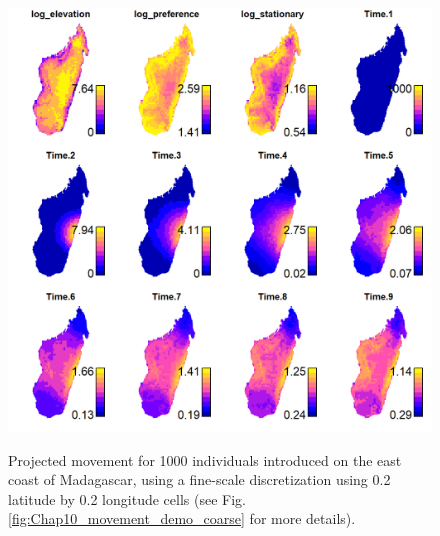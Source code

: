 \begin{figure}[!ht]
    \caption[Projected movement for using a fine spatial resolution]{Projected movement for 1000 individuals introduced on the east coast of Madagascar, using a fine-scale discretization using 0.2 latitude by 0.2 longitude cells (see Fig. \ref{fig:Chap10_movement_demo_coarse} for more details).}
    \includegraphics[width=5.5in]{Chap_10/Demo_cellsize02.png}
    \label{fig:Chap10_movement_demo_fine}
\end{figure}

